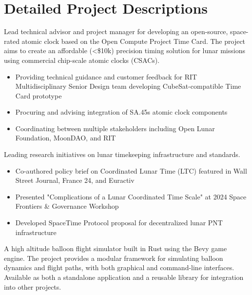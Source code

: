 \documentclass[10pt,final,sans]{resume}
\begin{document}
\break
\section{Detailed Project Descriptions}
 Lead
technical advisor and project manager for developing an open-source, space-rated
atomic clock based on the Open Compute Project Time Card. The project aims to
create an affordable (<\$10k) precision timing solution for lunar missions using
commercial chip-scale atomic clocks (CSACs).

\begin{itemize}
    \item Providing technical guidance and customer feedback for RIT Multidisciplinary Senior Design team developing CubeSat-compatible Time Card prototype
    \item Procuring and advising integration of SA.45s atomic clock components
    \item Coordinating between multiple stakeholders including Open Lunar Foundation, MoonDAO, and RIT
\end{itemize}

Leading research initiatives on lunar timekeeping infrastructure and standards.
\begin{itemize}
    \item Co-authored policy brief on Coordinated Lunar Time (LTC) featured in Wall Street Journal, France 24, and Euractiv
    \item Presented "Complications of a Lunar Coordinated Time Scale" at 2024 Space Frontiers \& Governance Workshop
    \item Developed SpaceTime Protocol proposal for decentralized lunar PNT infrastructure
\end{itemize}

 A high altitude balloon flight simulator built
in Rust using the Bevy game engine. The project provides a modular framework for
simulating balloon dynamics and flight paths, with both graphical and command-line
interfaces. Available as both a standalone application and a reusable library for
integration into other projects.
\end{document}
